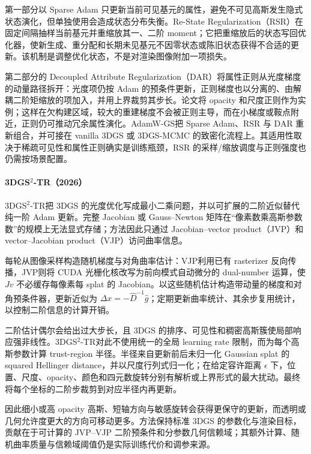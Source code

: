 第一部分以 Sparse Adam 只更新当前可见基元的属性，避免不可见高斯发生隐式状态演化，但单独使用会造成状态分布失衡。Re-State Regularization（RSR）在固定间隔抽样当前基元并重缩放其一、二阶 moment；它把重缩放后的状态写回优化器，使新生成、重分配和长期未见基元不因零状态或陈旧状态获得不合适的更新。该机制是调整优化状态，不是对渲染图像附加一项损失。

第二部分的 Decoupled Attribute Regularization（DAR）将属性正则从光度梯度的动量路径拆开：光度项仍按 Adam 的预条件更新，正则梯度也以分离的、由解耦二阶矩缩放的项加入，并用上界裁剪其步长。论文将 opacity 和尺度正则作为实例；这样在欠构建区域，较大的重建梯度不会被正则主导，而在小梯度或鞍点附近，正则仍可推动冗余属性演化。AdamW-GS把 Sparse Adam、RSR 与 DAR 重新组合，并可接在 vanilla 3DGS 或 3DGS-MCMC 的致密化流程上。其适用性取决于稀疏可见性和属性正则确实是训练瓶颈，RSR 的采样/缩放调度与正则强度也仍需按场景配置。

\paragraph{3DGS$^2$-TR（2026）\cite{2602_00395}}
3DGS$^2$-TR把 3DGS 的光度优化写成最小二乘问题，并以可扩展的二阶近似替代纯一阶 Adam 更新。完整 Jacobian 或 Gauss--Newton 矩阵在“像素数乘高斯参数数”的规模上无法显式存储；方法因此只通过 Jacobian--vector product（JVP）和 vector--Jacobian product（VJP）访问曲率信息。

每轮从图像采样构造随机梯度与对角曲率估计：VJP利用已有 rasterizer 反向传播，JVP则将 CUDA 光栅化核改写为前向模式自动微分的 dual-number 运算，使 $Jv$ 不必缓存每像素每 splat 的 Jacobian。以这些随机估计构造带动量的梯度和对角预条件器，更新近似为 $\Delta x=-\widehat D^{-1}\widehat g$；定期更新曲率统计、其余步复用统计，以控制二阶信息的计算开销。

二阶估计偶尔会给出过大步长，且 3DGS 的排序、可见性和稠密高斯簇使局部响应强非线性。3DGS$^2$-TR对此不使用统一的全局 learning rate 限制，而为每个高斯参数计算 trust-region 半径。半径来自更新前后未归一化 Gaussian splat 的 squared Hellinger distance，并以尺度行列式归一化；在给定容许距离 $\epsilon$ 下，位置、尺度、opacity、颜色和四元数旋转分别有解析或上界形式的最大扰动。最终将每个坐标的二阶步裁剪到对应半径内再更新。

因此细小或高 opacity 高斯、短轴方向与敏感旋转会获得更保守的更新，而透明或几何允许度更大的方向可移动更多。方法保持标准 3DGS 的参数化与渲染目标，贡献在于可计算的 JVP--VJP 二阶预条件和分参数几何信赖域；其额外计算、随机曲率质量与信赖域阈值仍是实际训练代价和调参来源。

